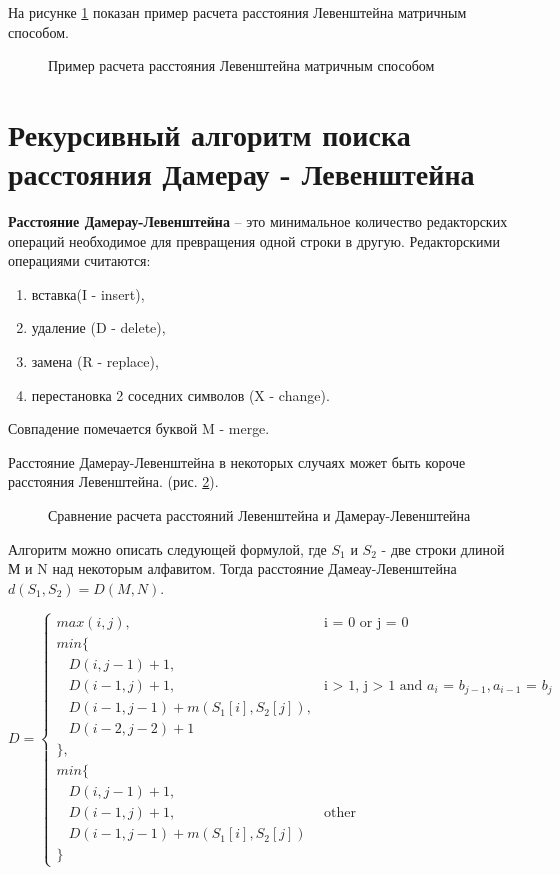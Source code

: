 На рисунке \ref{ris:recurs_example} показан пример расчета расстояния Левенштейна матричным способом.

\begin{figure}[H]
  \caption{Пример расчета расстояния Левенштейна матричным способом}
  \label{ris:recurs_example}
\end{figure}

\section{Рекурсивный алгоритм поиска расстояния Дамерау - Левенштейна}\label{Dameray_Leventshein}

\textbf{Расстояние Дамерау-Левенштейна} -- это минимальное количество редакторских операций необходимое для 
превращения одной строки в другую. Редакторскими операциями считаются:
\begin{enumerate}
  \item вставка(I - insert), 
  \item удаление (D - delete), 
  \item замена (R - replace),
  \item перестановка 2 соседних символов (X - change).
\end{enumerate}
Совпадение помечается буквой M - merge.

Расстояние Дамерау-Левенштейна в некоторых случаях может быть короче расстояния Левенштейна. (рис. \ref{ris:dameray_levenshtein_example}).

\begin{figure}[H]
  \caption{Сравнение расчета расстояний Левенштейна и Дамерау-Левенштейна}
  \label{ris:dameray_levenshtein_example}
\end{figure}


Алгоритм можно описать следующей формулой, где $S_1$ и $S_2$ - две строки длиной М и N над некоторым алфавитом. 
Тогда расстояние Дамеау-Левенштейна $d(S_1, S_2) = D(M,N)$.

\begin{equation*}
  D = 
  \begin{cases}
    max(i,j), &\text{i = 0 or j = 0}\\
    min\{ \\
      ~~~~D(i,j-1)+1,\\
      ~~~~D(i-1,j)+1, &\text{i > 1, j > 1 and $a_i$ = $b_{j-1},a_{i-1}$ = $b_j$}\\
      ~~~~D(i-1,j-1)+m(S_1[i],S_2[j]),\\
      ~~~~D(i-2,j-2)+1\\
    \},\\
    min\{ \\
      ~~~~D(i,j-1)+1,\\
      ~~~~D(i-1,j)+1, &\text{other}\\
      ~~~~D(i-1,j-1)+m(S_1[i],S_2[j])\\
    \}
    \end{cases}
\end{equation*}

